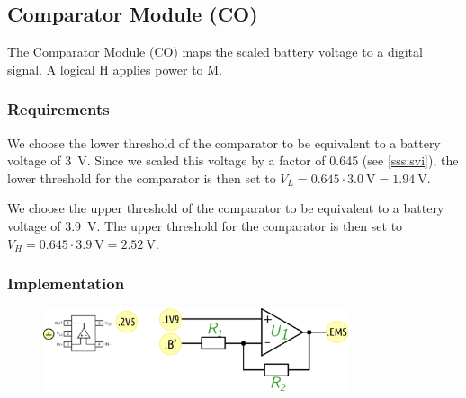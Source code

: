 \subsection{Comparator Module (CO) }
\label{sec:CO}

The Comparator Module (CO) maps the scaled battery voltage to a digital signal.
A logical H applies power to \mu M.


\subsubsection{Requirements}

We choose the lower threshold of the comparator to be equivalent to a battery voltage of
\SI{3}{\V}. Since we scaled this voltage by a factor of 0.645 (see \ref{sss:svi}), the lower threshold
for the comparator is then set
to $V_L=   0.645 \cdot\qty{ 3.0}{\V} = \qty{ 1.94}{\V}$.
\par
We choose the upper threshold of the comparator to be equivalent to a battery voltage of
\SI{3.9}{\V}. The upper threshold
for the comparator is then set
to $V_H= 0.645 \cdot \qty{3.9}{\V} = \qty{2.52}{\V}$.



\subsubsection{Implementation}


\begin{figure}[h]
    \centering
    \includegraphics[width=0.8\textwidth]{PO/CO/CO}
\end{figure}



\clearpage

\clearpage